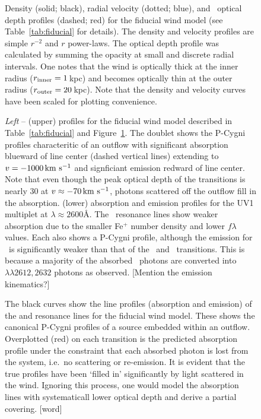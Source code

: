 \documentclass[12pt,preprint]{aastex}
\begin{document}
\begin{figure}
\caption{
Density (solid; black), radial velocity (dotted; blue), and
\mgiia\ optical depth profiles (dashed; red) for the fiducial
wind model (see Table~\ref{tab:fiducial} for details).
The density and velocity profiles are simple $r^{-2}$ and $r$
power-laws.  The optical depth profile was calculated by summing
the opacity at small and discrete radial intervals.  One notes that
the wind is optically thick at the inner radius ($r_{\rm inner} =
1$\,kpc) and becomes optically thin at the outer radius ($r_{\rm
  outer} = 20$\,kpc).
Note that the density and velocity curves have been scaled for plotting
convenience.  
}
\label{fig:fiducial_nvt}
\end{figure}

\begin{figure}
\caption{
{\it Left} -- (upper)  profiles for the fiducial wind model
described in Table~\ref{tab:fiducial} and
Figure~\ref{fig:fiducial_nvt}.  The doublet shows the P-Cygni profiles
characteritic of an outflow with significant absorption blueward of
line center (dashed vertical lines) extending to $v = -1000\, {\rm km~s^{-1}}$
and signficiant emission redward of line center.  Note
that even though the peak optical depth of the  transitions
is nearly 30 at $v \approx -70 \, {\rm km~s^{-1}}$, photons scattered off the outflow
fill in the absorption.
(lower)  absorption and emission profiles for the UV1
multiplet at $\lambda \approx 2600$\AA.  The \feiid\ resonance lines 
show weaker absorption due to the smaller Fe$^+$ number density and
lower $f\lambda$ values.  Each also shows a P-Cygni profile, although
the emission for \feiia\ is significantly weaker than that of the
\feiib\ and \mgiid\ transitions.  This is because a majority of the
absorbed \feiia\ photons are converted into
~$\lambda\lambda 2612, 2632$ photons as observed.
[Mention the emission kinematics?]
}
\label{fig:fiducial_1d}
\end{figure}

\begin{figure}
\caption{
The black curves show the line profiles (absorption and emission) of
the  and  resonance lines for the fiducial wind
model.  These shows the canonical P-Cygni profiles of a source
embedded within an outflow.  Overplotted (red) on each transition is
the predicted absorption profile under the constraint that each
absorbed photon is lost from the system, i.e.\ no scattering or
re-emission.   It is evident that the true profiles have been `filled
in' significantly by light scattered in the wind.  Ignoring this
process, one would model the absorption lines with systematicall lower
optical depth and derive a partial covering. [word]
}
\label{fig:noemiss}
\end{figure}
\end{document}
